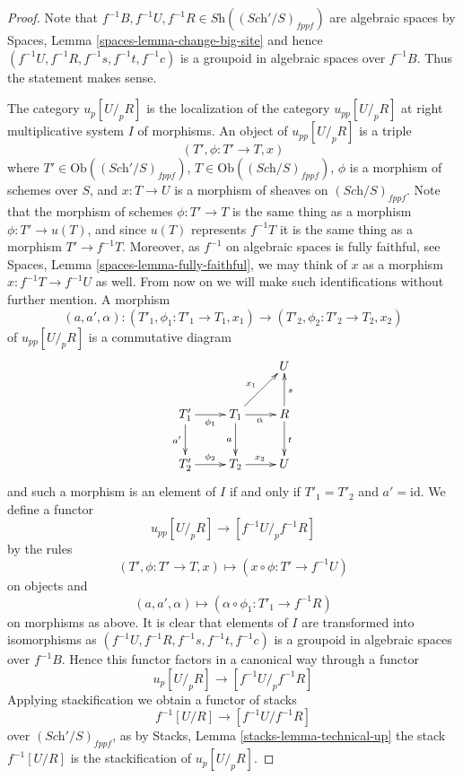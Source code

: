 \begin{proof}
Note that $f^{-1}B, f^{-1}U, f^{-1}R \in \textit{Sh}((\textit{Sch}'/S)_{fppf})$
are algebraic spaces by
Spaces, Lemma \ref{spaces-lemma-change-big-site}
and hence $(f^{-1}U, f^{-1}R, f^{-1}s, f^{-1}t, f^{-1}c)$
is a groupoid in algebraic spaces over $f^{-1}B$. Thus the statement makes
sense.

\medskip\noindent
The category $u_p[U/_{\!p}R]$ is the localization of the category
$u_{pp}[U/_{\!p}R]$ at right multiplicative system $I$ of morphisms.
An object of $u_{pp}[U/_{\!p}R]$ is a triple
$$
(T', \phi : T' \to T, x)
$$
where
$T' \in \text{Ob}((\textit{Sch}'/S)_{fppf})$,
$T \in \text{Ob}((\textit{Sch}/S)_{fppf})$, $\phi$ is a morphism of schemes
over $S$, and $x : T \to U$ is a morphism of sheaves on
$(\textit{Sch}/S)_{fppf}$. Note that the morphism of
schemes $\phi : T' \to T$ is the same thing as a morphism
$\phi : T' \to u(T)$, and since $u(T)$ represents $f^{-1}T$ it is the
same thing as a morphism $T' \to f^{-1}T$. Moreover, as $f^{-1}$ on
algebraic spaces is fully faithful, see
Spaces, Lemma \ref{spaces-lemma-fully-faithful},
we may think of $x$ as a morphism $x : f^{-1}T \to f^{-1}U$ as well.
From now on we will make such identifications without further mention.
A morphism
$$
(a, a', \alpha) :
(T'_1, \phi_1 : T'_1 \to T_1, x_1)
\longrightarrow
(T'_2, \phi_2 : T'_2 \to T_2, x_2)
$$
of $u_{pp}[U/_{\!p}R]$ is a commutative diagram
$$
\xymatrix{
& & U \\
T'_1 \ar[d]_{a'} \ar[r]_{\phi_1} &
T_1 \ar[d]_a \ar[ru]^{x_1} \ar[r]_\alpha &
R \ar[d]^t \ar[u]_s \\
T'_2 \ar[r]^{\phi_2} &
T_2 \ar[r]^{x_2} &
U
}
$$
and such a morphism is an element of $I$ if and only if
$T'_1 = T'_2$ and $a' = \text{id}$.
We define a functor
$$
u_{pp}[U/_{\!p}R] \longrightarrow [f^{-1}U/_{\!p}f^{-1}R]
$$
by the rules
$$
(T', \phi : T' \to T, x) \longmapsto (x \circ \phi : T' \to f^{-1}U)
$$
on objects and
$$
(a, a', \alpha) \longmapsto (\alpha \circ \phi_1 : T'_1 \to f^{-1}R)
$$
on morphisms as above. It is clear that elements of $I$ are transformed
into isomorphisms as $(f^{-1}U, f^{-1}R, f^{-1}s, f^{-1}t, f^{-1}c)$
is a groupoid in algebraic spaces over $f^{-1}B$. Hence this functor
factors in a canonical way through a functor
$$
u_p[U/_{\!p}R] \longrightarrow [f^{-1}U/_{\!p}f^{-1}R]
$$
Applying stackification we obtain a functor of stacks
$$
f^{-1}[U/R] \longrightarrow [f^{-1}U/f^{-1}R]
$$
over $(\textit{Sch}'/S)_{fppf}$, as by
Stacks, Lemma \ref{stacks-lemma-technical-up}
the stack $f^{-1}[U/R]$ is the stackification of $u_p[U/_{\!p}R]$.


\end{proof}
